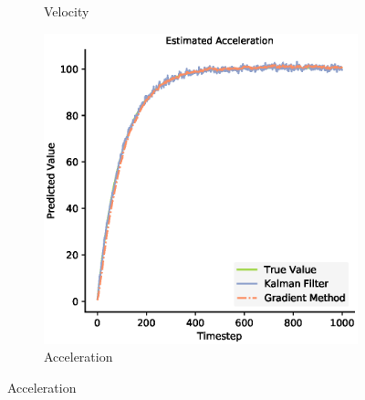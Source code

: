 \begin{figure}[H]
\begin{subfigure}{0.32\textwidth}
 \caption{Velocity}
 \end{subfigure}
 \begin{subfigure}{0.32\textwidth}\quad
 \centering
 \includegraphics[width=.8\linewidth]{chapter_3_figures/Estimated_Acceleration_NKF.eps}
 \caption{Acceleration}
 \end{subfigure}
 \medskip


\end{figure}
